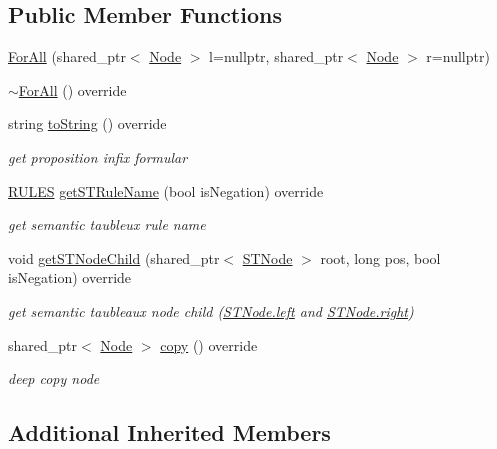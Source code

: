 \subsection*{Public Member Functions}
\begin{DoxyCompactItemize}
\item 
\hyperlink{class_for_all_a2f654f00f8d997a89699dff8f1efd759}{For\+All} (shared\+\_\+ptr$<$ \hyperlink{class_node}{Node} $>$ l=nullptr, shared\+\_\+ptr$<$ \hyperlink{class_node}{Node} $>$ r=nullptr)
\item 
\hyperlink{class_for_all_a0c63e42814329a95378fe95f41a369fa}{$\sim$\+For\+All} () override
\item 
string \hyperlink{class_for_all_a086dc15d85fe4874c477c72a40577b85}{to\+String} () override
\begin{DoxyCompactList}\small\item\em get proposition infix formular \end{DoxyCompactList}\item 
\hyperlink{proposition_2tableaux_2enum_8h_a70c93904c6a27d228050f922eb4fc3b8}{R\+U\+L\+ES} \hyperlink{class_for_all_a97e03dcd8f51824fe629487847b7c4dc}{get\+S\+T\+Rule\+Name} (bool is\+Negation) override
\begin{DoxyCompactList}\small\item\em get semantic taubleux rule name \end{DoxyCompactList}\item 
void \hyperlink{class_for_all_a847b6ce62d4e04ce7487b2cc1b49164f}{get\+S\+T\+Node\+Child} (shared\+\_\+ptr$<$ \hyperlink{class_s_t_node}{S\+T\+Node} $>$ root, long pos, bool is\+Negation) override
\begin{DoxyCompactList}\small\item\em get semantic taubleaux node child (\hyperlink{class_s_t_node_a19ba8bab4660bdeee0e897687b451a8b}{S\+T\+Node.\+left} and \hyperlink{class_s_t_node_a66d06118063fb739058f91c75b725e27}{S\+T\+Node.\+right}) \end{DoxyCompactList}\item 
shared\+\_\+ptr$<$ \hyperlink{class_node}{Node} $>$ \hyperlink{class_for_all_ae9b3918a9cd0870a20b80db2288fe402}{copy} () override
\begin{DoxyCompactList}\small\item\em deep copy node \end{DoxyCompactList}\end{DoxyCompactItemize}
\subsection*{Additional Inherited Members}


